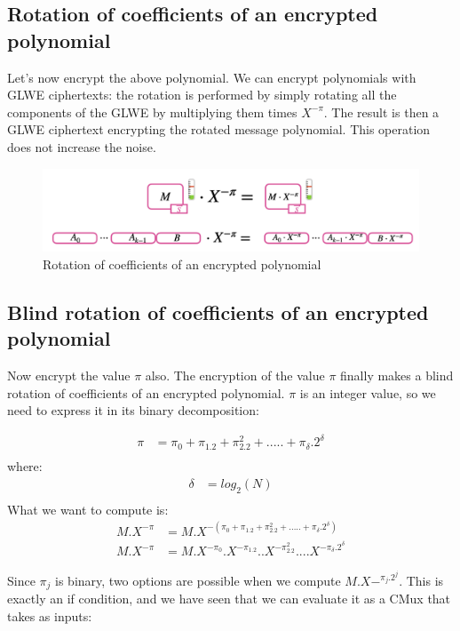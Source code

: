 \documentclass{techrep}
\theoremstyle{definition}
\theoremstyle{plain}
\begin{document}
\subsection{Rotation of coefficients of an encrypted polynomial}
Let's now encrypt the above polynomial. We can encrypt polynomials with GLWE ciphertexts: the rotation is performed by simply rotating all the components of the GLWE by multiplying them times $X^{-\pi}$. The result is then a GLWE ciphertext encrypting the rotated message polynomial. This operation does not increase the noise.

	\begin{figure}[H]
		\centering
	\includegraphics[width=0.9\columnwidth]{fig/rotation_1.png}
		\caption{Rotation of coefficients of an encrypted polynomial}
		\label{fig:rotation_1}
	\end{figure}

\subsection{Blind rotation of coefficients of an encrypted polynomial}
Now encrypt the value $\pi$ also. The encryption of the value $\pi$ finally makes a blind rotation of coefficients of an encrypted polynomial. $\pi$ is an integer value, so we need to express it in its binary decomposition: 

    \begin{align*}
    \pi	&= \pi_0 + \pi_1.2 	 + \pi_2.2^2 + ..... + \pi_\delta.2^\delta \\
    \end{align*}
where:
    \begin{align*}
    \delta &= {log}_2(N) \\
    \end{align*}
What we want to compute is:    
    \begin{align*}
    M.X^{-\pi} &= M.X^{-(\pi_0 + \pi_1.2 	 + \pi_2.2^2 + ..... + \pi_\delta.2^\delta)} \\
    M.X^{-\pi} &= M.X^{-\pi_0}.X^{-\pi_1.2}..X^{-\pi_2.2^2}....X^{-\pi_\delta.2^\delta}
    \end{align*}

 Since $\pi_j$ is binary, two options are possible when we compute $M.X-^{\pi_j.2^j}$. This is exactly an if condition, and we have seen that we can evaluate it as a CMux that takes as inputs:
\end{document}
